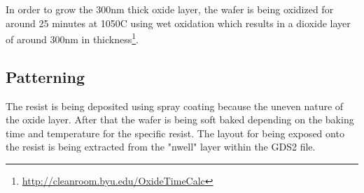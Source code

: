 In order to grow the 300nm thick oxide layer, the wafer is being oxidized for around 25 minutes at 1050\degree C using wet oxidation which results in a dioxide layer of around 300nm in thickness\footnote{\url{http://cleanroom.byu.edu/OxideTimeCalc}}.

\subsection{Patterning}

The resist is being deposited using spray coating because the uneven nature of the oxide layer.
After that the wafer is being soft baked depending on the baking time and temperature for the specific resist.
The layout for being exposed onto the resist is being extracted from the "nwell" layer within the GDS2 file.

